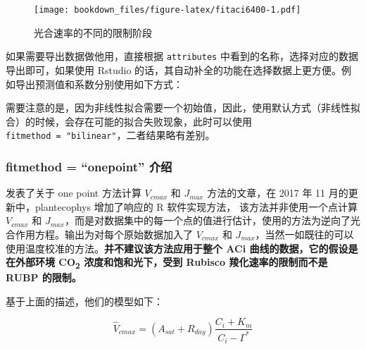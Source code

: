 \documentclass[
]{krantz}
\makeatletter
\newenvironment{Shaded}{\begin{snugshade}}{\end{snugshade}}
\newcommand{\AttributeTok}[1]{\textcolor[rgb]{0.77,0.63,0.00}{#1}}
\newcommand{\CommentTok}[1]{\textcolor[rgb]{0.56,0.35,0.01}{\textit{#1}}}
\newcommand{\FunctionTok}[1]{\textcolor[rgb]{0.00,0.00,0.00}{#1}}
\newcommand{\NormalTok}[1]{#1}
\newcommand{\OtherTok}[1]{\textcolor[rgb]{0.56,0.35,0.01}{#1}}
\newcommand{\SpecialCharTok}[1]{\textcolor[rgb]{0.00,0.00,0.00}{#1}}
\newcommand{\StringTok}[1]{\textcolor[rgb]{0.31,0.60,0.02}{#1}}
\renewenvironment{quote}{\begin{VF}}{\end{VF}}
\newenvironment{kframe}{%
\medskip{}
\setlength{\fboxsep}{.8em}
 \def\at@end@of@kframe{}%
 \ifinner\ifhmode%
  \def\at@end@of@kframe{\end{minipage}}%
  \begin{minipage}{\columnwidth}%
 \fi\fi%
 \def\FrameCommand##1{\hskip\@totalleftmargin \hskip-\fboxsep
 \colorbox{shadecolor}{##1}\hskip-\fboxsep
     \hskip-\linewidth \hskip-\@totalleftmargin \hskip\columnwidth}%
 \MakeFramed {\advance\hsize-\width
   \@totalleftmargin\z@ \linewidth\hsize
   \@setminipage}}%
 {\par\unskip\endMakeFramed%
 \at@end@of@kframe}
\renewenvironment{Shaded}{\begin{kframe}}{\end{kframe}}
\makeatother
\begin{document}
\begin{figure}
\centering
\texttt{[image: bookdown\_files/figure-latex/fitaci6400-1.pdf]}
\caption{\label{fig:fitaci6400}光合速率的不同的限制阶段}
\end{figure}

如果需要导出数据做他用，直接根据 \texttt{attributes} 中看到的名称，选择对应的数据导出即可，如果使用 Rstudio 的话，其自动补全的功能在选择数据上更方便。例如导出预测值和系数分别使用如下方式：

\begin{Shaded}
\end{Shaded}

\begin{quote}
需要注意的是，因为非线性拟合需要一个初始值，因此，使用默认方式（非线性拟合）的时候，会存在可能的拟合失败现象，此时可以使用 \texttt{fitmethod\ =\ "bilinear"}，二者结果略有差别。
\end{quote}

\hypertarget{onepoint}{%
\subsubsection{fitmethod = ``onepoint'' 介绍}\label{onepoint}}

\citet{De2016A} 发表了关于 one point 方法计算 \(V_{cmax}\) 和 \(J_{max}\) 方法的文章，在 2017 年 11 月的更新中，plantecophys 增加了响应的 R 软件实现方法， 该方法并非使用一个点计算 \(V_{cmax}\) 和 \(J_{max}\)，而是对数据集中的每一个点的值进行估计，使用的方法为逆向了光合作用方程。输出为对每个原始数据加入了 \(V_{cmax}\) 和 \(J_{max}\)，当然一如既往的可以使用温度校准的方法。\textbf{并不建议该方法应用于整个 ACi 曲线的数据，它的假设是在外部环境 CO\textsubscript{2} 浓度和饱和光下，受到 Rubisco 羧化速率的限制而不是 RUBP 的限制。}

基于上面的描述，他们的模型如下：

\begin{equation}
\hat{V}_{cmax} = (A_{sat} + R_{day}) \frac{C_i + K_m}{C_i - \Gamma^*} 
\label{eq:inverseA}
\end{equation}
\end{document}
